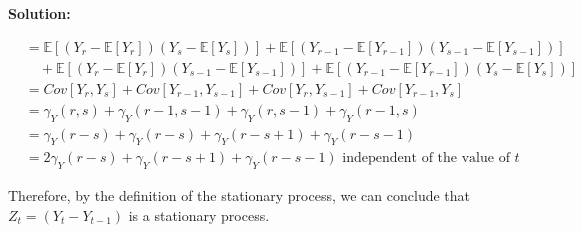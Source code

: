 \documentclass[11pt]{article}
\theoremstyle{plain} %
\newenvironment{solution}
{\color{C2}\normalfont\begin{framed}\begingroup\textbf{Solution:} }
  {\endgroup\end{framed}}
\theoremstyle{remark}
\newcommand{\EE}{\mathbb{E}}
\begin{document}
\begin{solution}
\begin{enumerate}[label = (\alph*)]
{\begin{enumerate}[label=(\roman*)]
{\begin{align*}
				                            & = \EE[(Y_{r}-\EE[Y_{r}])(Y_{s}-\EE[Y_{s}])] + \EE[(Y_{r-1}-\EE[Y_{r-1}])(Y_{s-1}-\EE[Y_{s-1}])]                          \\
				                            & \quad + \EE[(Y_{r}-\EE[Y_{r}])(Y_{s-1}-\EE[Y_{s-1}])] + \EE[(Y_{r-1}-\EE[Y_{r-1}])(Y_{s}-\EE[Y_{s}])]                    \\
				                            & = Cov[Y_{r}, Y_{s}] + Cov[Y_{r-1}, Y_{s-1}] + Cov[Y_{r}, Y_{s-1}] + Cov[Y_{r-1}, Y_{s}]                                  \\
				                            & = \gamma_{Y}(r, s) + \gamma_{Y}(r-1, s-1) + \gamma_{Y}(r, s-1) + \gamma_{Y}(r-1, s)                                      \\
				                            & = \gamma_{Y}(r-s) + \gamma_{Y}(r-s) + \gamma_{Y}(r-s+1) + \gamma_{Y}(r-s-1)                                              \\
				                            & = 2\gamma_{Y}(r-s) + \gamma_{Y}(r-s+1) + \gamma_{Y}(r-s-1) \text{ independent of the value of } t
			            \end{align*}
			            }\end{enumerate}
		      Therefore, by the definition of the stationary process, we can conclude that $Z_t=\left(Y_{t}-Y_{t-1}\right)$ is a stationary process.

}
\end{enumerate}
\end{solution}
\end{document}
